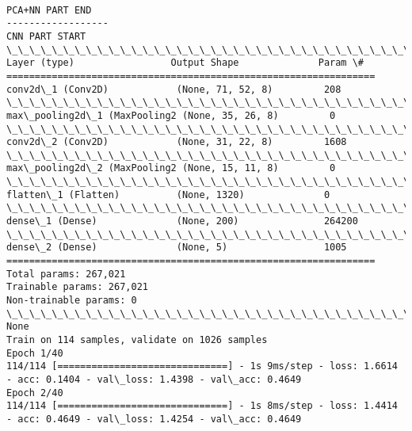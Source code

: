 \documentclass[11pt]{article}
\begin{document}
    \begin{center}
    \end{center}
    { \hspace*{\fill} \\}
    
    \begin{Verbatim}[commandchars=\\\{\}]
PCA+NN PART END
------------------
CNN PART START
\_\_\_\_\_\_\_\_\_\_\_\_\_\_\_\_\_\_\_\_\_\_\_\_\_\_\_\_\_\_\_\_\_\_\_\_\_\_\_\_\_\_\_\_\_\_\_\_\_\_\_\_\_\_\_\_\_\_\_\_\_\_\_\_\_
Layer (type)                 Output Shape              Param \#   
=================================================================
conv2d\_1 (Conv2D)            (None, 71, 52, 8)         208       
\_\_\_\_\_\_\_\_\_\_\_\_\_\_\_\_\_\_\_\_\_\_\_\_\_\_\_\_\_\_\_\_\_\_\_\_\_\_\_\_\_\_\_\_\_\_\_\_\_\_\_\_\_\_\_\_\_\_\_\_\_\_\_\_\_
max\_pooling2d\_1 (MaxPooling2 (None, 35, 26, 8)         0         
\_\_\_\_\_\_\_\_\_\_\_\_\_\_\_\_\_\_\_\_\_\_\_\_\_\_\_\_\_\_\_\_\_\_\_\_\_\_\_\_\_\_\_\_\_\_\_\_\_\_\_\_\_\_\_\_\_\_\_\_\_\_\_\_\_
conv2d\_2 (Conv2D)            (None, 31, 22, 8)         1608      
\_\_\_\_\_\_\_\_\_\_\_\_\_\_\_\_\_\_\_\_\_\_\_\_\_\_\_\_\_\_\_\_\_\_\_\_\_\_\_\_\_\_\_\_\_\_\_\_\_\_\_\_\_\_\_\_\_\_\_\_\_\_\_\_\_
max\_pooling2d\_2 (MaxPooling2 (None, 15, 11, 8)         0         
\_\_\_\_\_\_\_\_\_\_\_\_\_\_\_\_\_\_\_\_\_\_\_\_\_\_\_\_\_\_\_\_\_\_\_\_\_\_\_\_\_\_\_\_\_\_\_\_\_\_\_\_\_\_\_\_\_\_\_\_\_\_\_\_\_
flatten\_1 (Flatten)          (None, 1320)              0         
\_\_\_\_\_\_\_\_\_\_\_\_\_\_\_\_\_\_\_\_\_\_\_\_\_\_\_\_\_\_\_\_\_\_\_\_\_\_\_\_\_\_\_\_\_\_\_\_\_\_\_\_\_\_\_\_\_\_\_\_\_\_\_\_\_
dense\_1 (Dense)              (None, 200)               264200    
\_\_\_\_\_\_\_\_\_\_\_\_\_\_\_\_\_\_\_\_\_\_\_\_\_\_\_\_\_\_\_\_\_\_\_\_\_\_\_\_\_\_\_\_\_\_\_\_\_\_\_\_\_\_\_\_\_\_\_\_\_\_\_\_\_
dense\_2 (Dense)              (None, 5)                 1005      
=================================================================
Total params: 267,021
Trainable params: 267,021
Non-trainable params: 0
\_\_\_\_\_\_\_\_\_\_\_\_\_\_\_\_\_\_\_\_\_\_\_\_\_\_\_\_\_\_\_\_\_\_\_\_\_\_\_\_\_\_\_\_\_\_\_\_\_\_\_\_\_\_\_\_\_\_\_\_\_\_\_\_\_
None
Train on 114 samples, validate on 1026 samples
Epoch 1/40
114/114 [==============================] - 1s 9ms/step - loss: 1.6614 - acc: 0.1404 - val\_loss: 1.4398 - val\_acc: 0.4649
Epoch 2/40
114/114 [==============================] - 1s 8ms/step - loss: 1.4414 - acc: 0.4649 - val\_loss: 1.4254 - val\_acc: 0.4649

\end{Verbatim}
\end{document}
